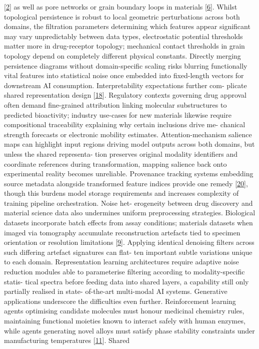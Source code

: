 \documentclass[
]{article}
\begin{document}
{[}\protect\hyperlink{_bookmark42}{2}{]} as well as pore networks or
grain boundary loops in materials
{[}\protect\hyperlink{_bookmark46}{6}{]}. Whilst topological persistence
is robust to local geometric perturbations across both domains, the
filtration parameters determining which features appear significant may
vary unpredictably between data types, electrostatic potential
thresholds matter more in drug-receptor topology; mechanical contact
thresholds in grain topology depend on completely different physical
constants. Directly merging persistence diagrams without domain-specific
scaling risks blurring functionally vital features into statistical
noise once embedded into fixed-length vectors for downstream AI
consumption. Interpretability expectations further com- plicate shared
representation design {[}\protect\hyperlink{_bookmark58}{18}{]}.
Regulatory contexts governing drug approval often demand fine-grained
attribution linking molecular substructures to predicted bioactivity;
industry use-cases for new materials likewise require compositional
traceability explaining why certain inclusions drive me- chanical
strength forecasts or electronic mobility estimates. Attention-mechanism
salience maps can highlight input regions driving model outputs across
both domains, but unless the shared representa- tion preserves original
modality identifiers and coordinate references during transformation,
mapping salience back onto experimental reality becomes unreliable.
Provenance tracking systems embedding source metadata alongside
transformed feature indices provide one remedy
{[}\protect\hyperlink{_bookmark60}{20}{]}, though this burdens model
storage requirements and increases complexity of training pipeline
orchestration. Noise het- erogeneity between drug discovery and material
science data also undermines uniform preprocessing strategies.
Biological datasets incorporate batch effects from assay conditions;
materials datasets when imaged via tomography accumulate reconstruction
artefacts tied to specimen orientation or resolution limitations
{[}\protect\hyperlink{_bookmark49}{9}{]}. Applying identical denoising
filters across such differing artefact signatures can flat- ten
important subtle variations unique to each domain. Representation
learning architectures require adaptive noise reduction modules able to
parameterise filtering according to modality-specific statis- tical
spectra before feeding data into shared layers, a capability still only
partially realised in state- of-the-art multi-modal AI systems.
Generative applications underscore the difficulties even further.
Reinforcement learning agents optimising candidate molecules must honour
medicinal chemistry rules, maintaining functional moieties known to
interact safely with human enzymes, while agents generating novel alloys
must satisfy phase stability constraints under manufacturing
temperatures {[}\protect\hyperlink{_bookmark51}{11}{]}. Shared
\end{document}

